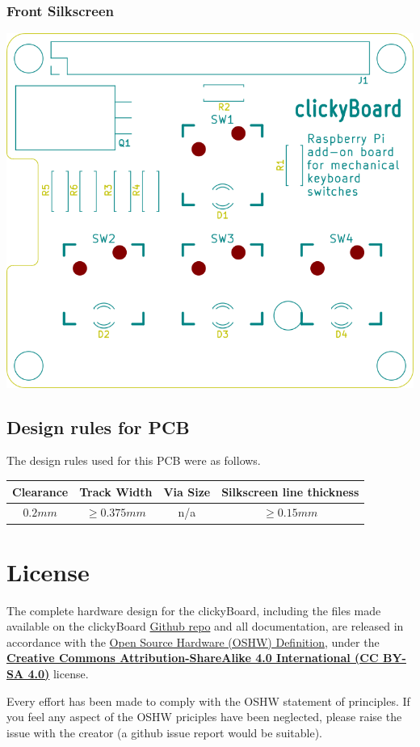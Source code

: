 \documentclass[10pt, a4paper, onesided]{article}
\begin{document}
		\subsubsection*{Front Silkscreen}
		\begin{center}
			\includegraphics[width=0.7\linewidth]{img/F_Ss}
		\end{center}
	
	\subsection{Design rules for PCB}

		The design rules used for this PCB were as follows.
	
		\begin{tabular}{c|c|c|c}
			Clearance & Track Width & Via Size & Silkscreen line thickness \\ 
			\hline 
			$0.2 mm$ & $\ge 0.375 mm$ & n/a & $\ge 0.15 mm$ \\ 
		\end{tabular} 

\section{License}

	The complete hardware design for the clickyBoard, including the files made available on the clickyBoard \href{https://github.com/SecretImbecile/clickyBoard}{Github repo} and all documentation, are released in accordance with the \href{https://www.oshwa.org/definition/}{Open Source Hardware (OSHW) Definition}, under the \href{https://creativecommons.org/licenses/by-sa/4.0/}{\textbf{Creative Commons Attribution-ShareAlike 4.0 International (CC BY-SA 4.0)}} license.
	
	Every effort has been made to comply with the OSHW statement of principles. If you feel any aspect of the OSHW priciples have been neglected, please raise the issue with the creator (a github issue report would be suitable).
\end{document}
